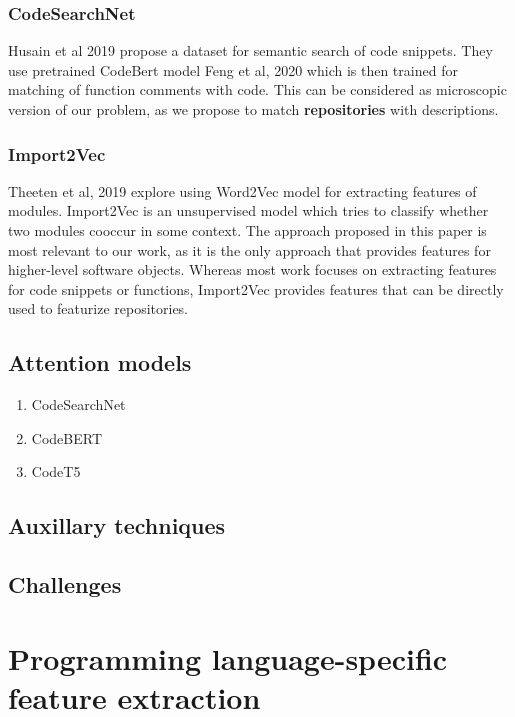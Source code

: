 \documentclass[11pt]{report}
\begin{document}
\subsubsection{CodeSearchNet}
Husain et al 2019 \cite{DBLP:journals/corr/abs-1909-09436} propose a dataset for semantic search of code snippets. They use pretrained CodeBert model Feng et al, 2020 \cite{feng2020codebert} which is then trained for matching of function comments with code.
This can be considered as microscopic version of our problem, as we propose to match \textbf{repositories} with descriptions. 

\subsubsection{Import2Vec}

Theeten et al, 2019 \cite{DBLP:journals/corr/abs-1904-03990} explore using Word2Vec model for extracting features of modules. Import2Vec is an unsupervised model which tries to classify whether two modules cooccur in some context.
The approach proposed in this paper is most relevant to our work, as it is the only approach that provides features for higher-level software objects.
Whereas most work focuses on extracting features for code snippets or functions, Import2Vec provides features that can be directly used to featurize repositories.

\subsection{Attention models}

\begin{enumerate}
\item CodeSearchNet

\item CodeBERT

\item{CodeT5}

\end{enumerate}

\subsection{Auxillary techniques}

\subsection{Challenges}

\section{Programming language-specific feature extraction}
\end{document}
